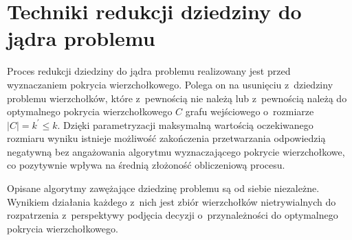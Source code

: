 \section{Techniki redukcji dziedziny do jądra problemu}\label{s_kernelization}

Proces redukcji dziedziny do jądra problemu realizowany jest przed wyznaczaniem pokrycia wierzchołkowego. 
Polega on na usunięciu z~dziedziny problemu wierzchołków, które z~pewnością nie należą lub z~pewnością należą do optymalnego pokrycia wierzchołkowego $C$ grafu wejściowego o~rozmiarze $|C| = k^\prime \leq k$.
Dzięki parametryzacji maksymalną wartością oczekiwanego rozmiaru wyniku istnieje możliwość zakończenia przetwarzania odpowiedzią negatywną bez
angażowania algorytmu wyznaczającego pokrycie wierzchołkowe, co pozytywnie
wpływa na średnią złożoność obliczeniową procesu.

Opisane algorytmy zawężające dziedzinę problemu są od siebie niezależne.
Wynikiem działania każdego z~nich jest zbiór wierzchołków nietrywialnych do
rozpatrzenia z~perspektywy podjęcia decyzji o~przynależności do optymalnego
pokrycia wierzchołkowego.







